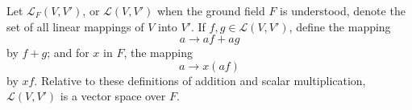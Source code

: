 Let $\mathcal{L}_F(V, V')$, or $\mathcal{L}(V, V')$ when the ground field $F$ is understood, denote the set of all linear mappings of $V$ into $V'$. If $f, g \in \mathcal{L}(V, V')$, define the mapping
$$
a \rightarrow af + ag
$$
by $f + g$; and for $x$ in $F$, the mapping
$$
a \rightarrow x(af)
$$
by $xf$. Relative to these definitions of addition and scalar multiplication, $\mathcal{L}(V, V')$ is a vector space over $F$.

